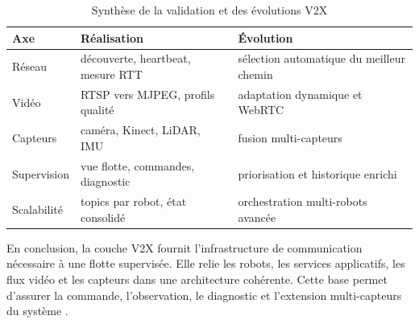 \begin{table}[H]
\centering
\small
\renewcommand{\arraystretch}{1.18}
\begin{tabular}{|p{3.4cm}|p{5.4cm}|p{5.0cm}|}
\hline
\textbf{Axe} & \textbf{Réalisation} & \textbf{Évolution} \\
\hline
Réseau & découverte, heartbeat, mesure RTT & sélection automatique du meilleur chemin \\
\hline
Vidéo & RTSP vers MJPEG, profils qualité & adaptation dynamique et WebRTC \\
\hline
Capteurs & caméra, Kinect, LiDAR, IMU & fusion multi-capteurs \\
\hline
Supervision & vue flotte, commandes, diagnostic & priorisation et historique enrichi \\
\hline
Scalabilité & topics par robot, état consolidé & orchestration multi-robots avancée \\
\hline
\end{tabular}
\caption{Synthèse de la validation et des évolutions V2X}
\label{tab:v2x_perspectives}
\end{table}

En conclusion, la couche V2X fournit l'infrastructure de communication nécessaire à une flotte supervisée. Elle relie les robots, les services applicatifs, les flux vidéo et les capteurs dans une architecture cohérente. Cette base permet d'assurer la commande, l'observation, le diagnostic et l'extension multi-capteurs du système .
